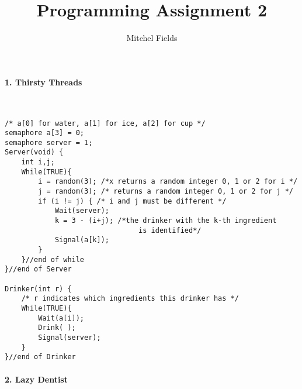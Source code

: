 \documentclass{article}
\begin{document}
\title{Programming Assignment 2}
\author{Mitchel Fields}
\date{}
\maketitle

\paragraph{1. Thirsty Threads}\mbox{}\\

\begin{verbatim}
/* a[0] for water, a[1] for ice, a[2] for cup */
semaphore a[3] = 0;
semaphore server = 1;
Server(void) {
    int i,j;
    While(TRUE){
        i = random(3); /*x returns a random integer 0, 1 or 2 for i */
        j = random(3); /* returns a random integer 0, 1 or 2 for j */
        if (i != j) { /* i and j must be different */
            Wait(server);
            k = 3 - (i+j); /*the drinker with the k-th ingredient
                                is identified*/
            Signal(a[k]);
        }
    }//end of while
}//end of Server

Drinker(int r) {
    /* r indicates which ingredients this drinker has */
    While(TRUE){
        Wait(a[i]);
        Drink( );
        Signal(server);
    }
}//end of Drinker
\end{verbatim}

\paragraph{2. Lazy Dentist}\mbox{}\\
\end{document}
